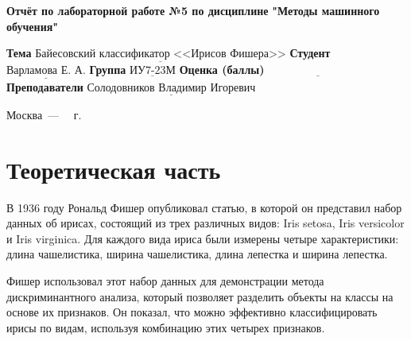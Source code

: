 \documentclass[12pt]{report}
\begin{document}
\begin{titlepage}
	
	\begin{center}
		\noindent\begin{minipage}{1.3\textwidth}\centering
			\Large\textbf{  Отчёт по лабораторной работе №5 по дисциплине}\newline
			\textbf{ "Методы машинного обучения"}\newline\newline
		\end{minipage}
	\end{center}
	
	\noindent\textbf{Тема} $\underline{\text{Байесовский классификатор <<Ирисов Фишера>>}}$\newline\newline
	\noindent\textbf{Студент} $\underline{\text{Варламова Е. А.}}$\newline\newline
	\noindent\textbf{Группа} $\underline{\text{ИУ7-23М}}$\newline\newline
	\noindent\textbf{Оценка (баллы)} $\underline{\text{~~~~~~~~~~~~~~~~~~~~~~~~~~~}}$\newline\newline
	\noindent\textbf{Преподаватели} $\underline{\text{Солодовников Владимир Игоревич}}$\newline\newline\newline
	
	\begin{center}
		\vfill
		Москва~---~\the\year
		~г.
	\end{center}
\end{titlepage}
\large
\setcounter{page}{2}
\def\contentsname{СОДЕРЖАНИЕ}
\renewcommand{\contentsname}{СОДЕРЖАНИЕ}
\tableofcontents
\renewcommand\labelitemi{---}
\newpage
\chapter{Теоретическая часть}

В 1936 году Рональд Фишер опубликовал статью, в которой он представил набор данных об ирисах, состоящий из трех различных видов: Iris setosa, Iris versicolor и Iris virginica. Для каждого вида ириса были измерены четыре характеристики: длина чашелистика, ширина чашелистика, длина лепестка и ширина лепестка.

Фишер использовал этот набор данных для демонстрации метода дискриминантного анализа, который позволяет разделить объекты на классы на основе их признаков. Он показал, что можно эффективно классифицировать ирисы по видам, используя комбинацию этих четырех признаков.
\end{document}
